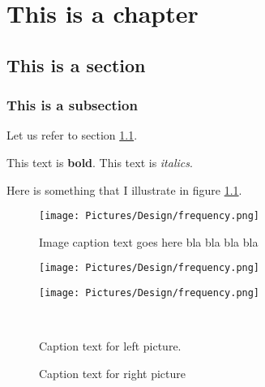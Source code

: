 \chapter{This is a chapter}
\section{This is a section} \label{sec:thisSection}
\subsection{This is a subsection}
Let us refer to section \ref{sec:thisSection}.

This text is \textbf{bold}.
This text is \textit{italics}.


Here is something that I illustrate in figure \ref{fig:wavelength}.

\begin{figure}[htbp]
\centering
\texttt{[image: Pictures/Design/frequency.png]}
\caption{Image caption text goes here bla bla bla bla}
\label{fig:wavelength}
\end{figure}

\begin{figure}[htbp] \centering
\begin{minipage}[b]{0.45\textwidth} \centering
\texttt{[image: Pictures/Design/frequency.png]} %
\end{minipage} \hfill
\begin{minipage}[b]{0.45\textwidth} \centering
\texttt{[image: Pictures/Design/frequency.png]} %
\end{minipage} \\ %
\begin{minipage}[t]{0.45\textwidth}
\caption{Caption text for left picture.} %
\label{fig:cap1}
\end{minipage} \hfill
\begin{minipage}[t]{0.45\textwidth}
\caption{Caption text for right picture} %
\label{fig:cap2}
\end{minipage}
\end{figure}

